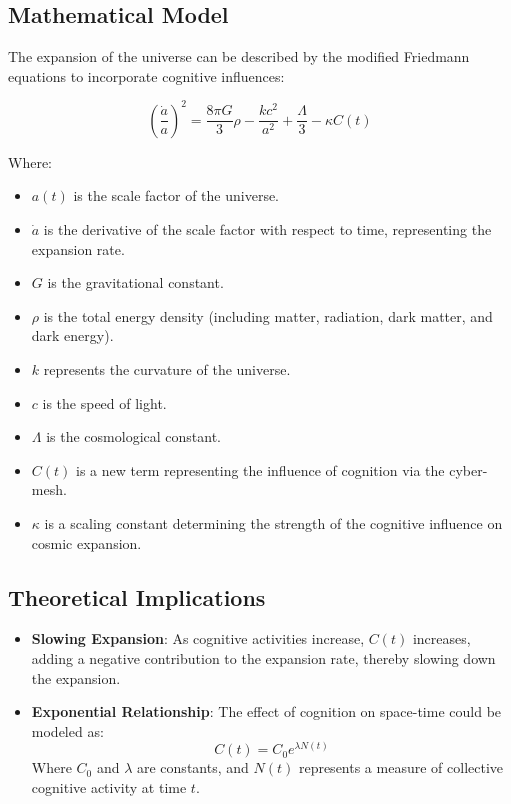 \documentclass{article}
\begin{document}
\subsection{Mathematical Model}
The expansion of the universe can be described by the modified Friedmann equations to incorporate cognitive influences:

\begin{equation}
\left(\frac{\dot{a}}{a}\right)^2 = \frac{8\pi G}{3}\rho - \frac{kc^2}{a^2} + \frac{\Lambda}{3} - \kappa C(t)
\end{equation}

Where:
\begin{itemize}
    \item $a(t)$ is the scale factor of the universe.
    \item $\dot{a}$ is the derivative of the scale factor with respect to time, representing the expansion rate.
    \item $G$ is the gravitational constant.
    \item $\rho$ is the total energy density (including matter, radiation, dark matter, and dark energy).
    \item $k$ represents the curvature of the universe.
    \item $c$ is the speed of light.
    \item $\Lambda$ is the cosmological constant.
    \item $C(t)$ is a new term representing the influence of cognition via the cyber-mesh.
    \item $\kappa$ is a scaling constant determining the strength of the cognitive influence on cosmic expansion.
\end{itemize}

\subsection{Theoretical Implications}
\begin{itemize}
    \item \textbf{Slowing Expansion}: As cognitive activities increase, $C(t)$ increases, adding a negative contribution to the expansion rate, thereby slowing down the expansion.
    \item \textbf{Exponential Relationship}: The effect of cognition on space-time could be modeled as:
    \begin{equation}
    C(t) = C_0 e^{\lambda N(t)}
    \end{equation}
    Where $C_0$ and $\lambda$ are constants, and $N(t)$ represents a measure of collective cognitive activity at time $t$.
\end{itemize}
\end{document}
